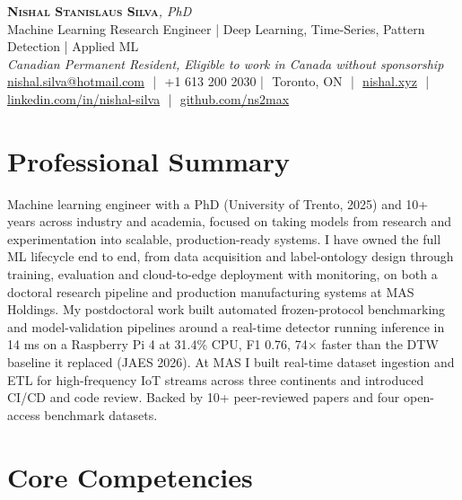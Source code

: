 \documentclass[11pt]{article}
\makeatletter
\newcommand{\cvName}{Nishal Stanislaus Silva}
\newcommand{\cvEmail}{nishal.silva@hotmail.com}
\newcommand{\cvPhone}{+1 613 200 2030}
\newcommand{\cvCity}{Toronto, ON}
\newcommand{\cvSite}{https://nishal.xyz}
\newcommand{\cvLinkedIn}{https://www.linkedin.com/in/nishal-silva}
\newcommand{\cvGitHub}{https://github.com/ns2max}
\newcommand{\cvStatus}{Canadian Permanent Resident, Eligible to work in Canada without sponsorship}
\newcommand{\cvTagline}{Machine Learning Research Engineer | Deep Learning, Time-Series, Pattern Detection | Applied ML}
\makeatother
\begin{document}
\pagestyle{empty}
\begin{center}
    {\LARGE \scshape \textbf{\cvName}}{\large \textit{, PhD}}\\[1pt]
    {\small \cvTagline}\\[1pt]
    {\footnotesize\textit{\cvStatus}}\\[1pt]
    {\small
    \href{mailto:\cvEmail}{\cvEmail} \,\,|\,\, \cvPhone \,\,|\,\, \cvCity
    \,\,|\,\, \href{\cvSite}{nishal.xyz} \,\,|\,\, \href{\cvLinkedIn}{linkedin.com/in/nishal-silva}
    \,\,|\,\, \href{\cvGitHub}{github.com/ns2max}}
\end{center}

\section*{Professional Summary}

Machine learning engineer with a PhD (University of Trento, 2025) and 10+ years across industry and academia, focused on taking models from research and experimentation into scalable, production-ready systems. I have owned the full ML lifecycle end to end, from data acquisition and label-ontology design through training, evaluation and cloud-to-edge deployment with monitoring, on both a doctoral research pipeline and production manufacturing systems at MAS Holdings. My postdoctoral work built automated frozen-protocol benchmarking and model-validation pipelines around a real-time detector running inference in 14 ms on a Raspberry Pi 4 at 31.4\% CPU, F1 0.76, 74$\times$ faster than the DTW baseline it replaced (JAES 2026). At MAS I built real-time dataset ingestion and ETL for high-frequency IoT streams across three continents and introduced CI/CD and code review. Backed by 10+ peer-reviewed papers and four open-access benchmark datasets.

\section*{Core Competencies}
\end{document}
